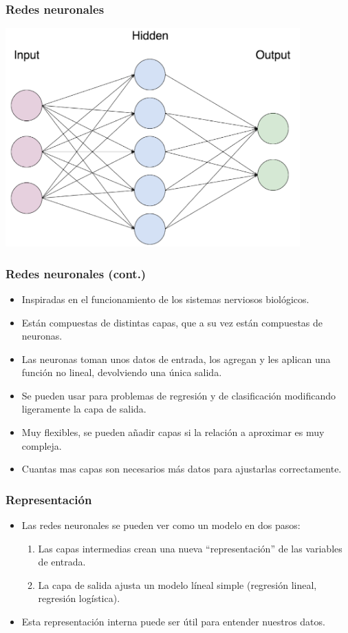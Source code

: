 \documentclass{beamer}
\begin{document}
\begin{frame}
\frametitle{Redes neuronales}
\centering
\includegraphics[width=0.85\textwidth]{nn.png}
\end{frame}

\begin{frame}
\frametitle{Redes neuronales (cont.)}

\begin{itemize}
\item Inspiradas en el funcionamiento de los sistemas nerviosos biológicos.
\item Están compuestas de distintas capas, que a su vez están compuestas de neuronas. 
\item Las neuronas toman unos datos de entrada, los agregan y les aplican una función no lineal, devolviendo una única salida.
\item Se pueden usar para problemas de regresión y de clasificación modificando ligeramente la capa de salida.
\item Muy flexibles, se pueden añadir capas si la relación a aproximar es muy compleja.
\item Cuantas mas capas son necesarios más datos para ajustarlas correctamente.
\end{itemize}
\end{frame}


\begin{frame}
\frametitle{Representación}
\begin{itemize}
\item Las redes neuronales se pueden ver como un modelo en dos pasos:
\begin{enumerate}
\item Las capas intermedias crean una nueva ``representación'' de las variables de entrada.
\item La capa de salida ajusta un modelo líneal simple (regresión lineal, regresión logística). 
\end{enumerate}
\item Esta representación interna puede ser útil para entender nuestros datos.
\end{itemize}
\end{frame}
\end{document}
